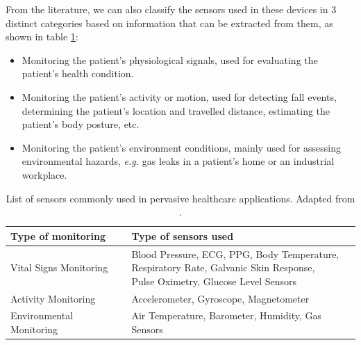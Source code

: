 From the literature, we can also classify the sensors used in these devices in 3 distinct categories based on information that can be extracted from them, as shown in table \ref{tab:layer1-sensors}:

\begin{itemize}
    \item Monitoring the patient's physiological signals, used for evaluating the patient's health condition.
    \item Monitoring the patient's activity or motion, used for detecting fall events, determining the patient's location and travelled distance, estimating the patient's body posture, etc.
    \item Monitoring the patient's environment conditions, mainly used for assessing environmental hazards, \textit{e.g.} gas leaks in a patient's home or an industrial workplace.
\end{itemize}


\renewcommand{\arraystretch}{2}
\begin{table}[H]
    \centering
    \begin{tabular}{l|l}
        \textbf{Type of monitoring} & \textbf{Type of sensors used} \\ 
        \hline
        Vital Signs Monitoring & \makecell{Blood Pressure, \acs{ECG}, \acs{PPG}, Body Temperature, \\ Respiratory Rate, Galvanic Skin Response, \\ Pulse Oximetry, Glucose Level Sensors} \\
        Activity Monitoring & Accelerometer, Gyroscope, Magnetometer\\
        Environmental Monitoring & Air Temperature, Barometer, Humidity, Gas Sensors \\
    \end{tabular}
    \caption[List of sensors commonly used in pervasive healthcare applications.]{List of sensors commonly used in pervasive healthcare applications. Adapted from \cite{MinhDang2019}.}
    \label{tab:layer1-sensors} 
\end{table}
\renewcommand{\arraystretch}{1}

